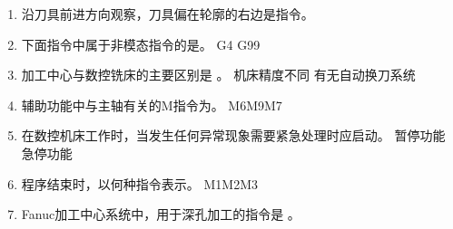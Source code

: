 \documentclass[12pt,twocolumn,landscape,UTF8,twoside]{ctexart}
\begin{document}
\begin{spacing}{1.3}
\begin{enumerate} [1、]
\item 沿刀具前进方向观察，刀具偏在轮廓的右边是指令。
\item 下面指令中属于非模态指令的是。
	{G4}	{G99}
\item 加工中心与数控铣床的主要区别是	。
	{机床精度不同}	{有无自动换刀系统}
\item 辅助功能中与主轴有关的M指令为。
 {M6}{M9}{M7}
\item 在数控机床工作时，当发生任何异常现象需要紧急处理时应启动。
	{暂停功能}	{急停功能}
\item 程序结束时，以何种指令表示。
	{M1}{M2}{M3}
\item Fanuc加工中心系统中，用于深孔加工的指令是		。

\end{enumerate}
\end{spacing}
\end{document}
